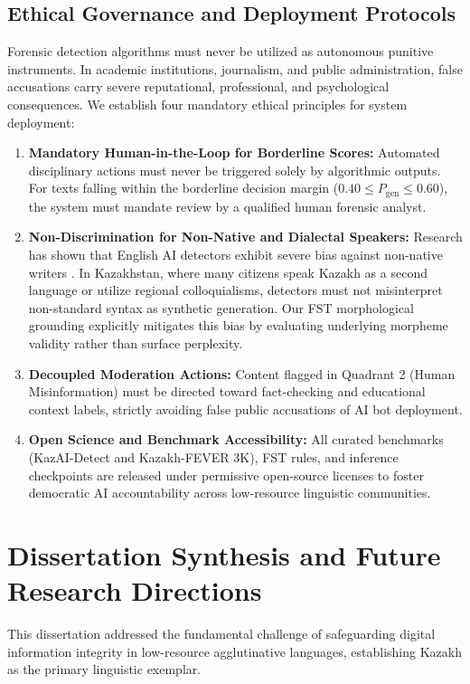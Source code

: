 \subsection{Ethical Governance and Deployment Protocols}
Forensic detection algorithms must never be utilized as autonomous punitive instruments. In academic institutions, journalism, and public administration, false accusations carry severe reputational, professional, and psychological consequences. We establish four mandatory ethical principles for system deployment:
\begin{enumerate}
    \item \textbf{Mandatory Human-in-the-Loop for Borderline Scores:} Automated disciplinary actions must never be triggered solely by algorithmic outputs. For texts falling within the borderline decision margin ($0.40 \le P_{\text{gen}} \le 0.60$), the system must mandate review by a qualified human forensic analyst.
    \item \textbf{Non-Discrimination for Non-Native and Dialectal Speakers:} Research has shown that English AI detectors exhibit severe bias against non-native writers \citep{liang2023gptdetectors}. In Kazakhstan, where many citizens speak Kazakh as a second language or utilize regional colloquialisms, detectors must not misinterpret non-standard syntax as synthetic generation. Our FST morphological grounding explicitly mitigates this bias by evaluating underlying morpheme validity rather than surface perplexity.
    \item \textbf{Decoupled Moderation Actions:} Content flagged in Quadrant 2 (Human Misinformation) must be directed toward fact-checking and educational context labels, strictly avoiding false public accusations of AI bot deployment.
    \item \textbf{Open Science and Benchmark Accessibility:} All curated benchmarks (KazAI-Detect and Kazakh-FEVER 3K), FST rules, and inference checkpoints are released under permissive open-source licenses to foster democratic AI accountability across low-resource linguistic communities.
\end{enumerate}

\section{Dissertation Synthesis and Future Research Directions}
\label{sec:dissertation_synthesis}

This dissertation addressed the fundamental challenge of safeguarding digital information integrity in low-resource agglutinative languages, establishing Kazakh as the primary linguistic exemplar. 

